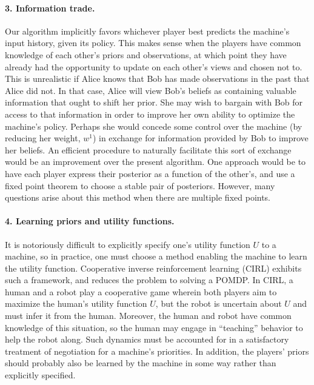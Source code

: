 \documentclass{article}  %
\begin{document}
\paragraph{3. Information trade.}  Our algorithm implicitly favors whichever player best predicts the machine's input history, given its policy.  This makes sense when the players have common knowledge of each other's priors and observations, at which point they have already had the opportunity to update on each other's views and chosen not to.  This is unrealistic if Alice knows that Bob has made observations in the past that Alice did not.  In that case, Alice will view Bob's beliefs as containing valuable information that ought to shift her prior.  She may wish to bargain with Bob for access to that information in order to improve her own ability to optimize the machine's policy.  Perhaps she would concede some control over the machine (by reducing her weight, $w^1$) in exchange for information provided by Bob to improve her beliefs.  An efficient procedure to naturally facilitate this sort of exchange would be an improvement over the present algorithm.  One approach would be to have each player express their posterior as a function of the other's, and use a fixed point theorem to choose a stable pair of posteriors.  However, many questions arise about this method when there are multiple fixed points.

\paragraph{4. Learning priors and utility functions.}  It is notoriously difficult to explicitly specify one's utility function $U$ to a machine, so in practice, one must choose a method enabling the machine to learn the utility function.  Cooperative inverse reinforcement learning (CIRL) \cite{HDAR16} exhibits such a framework, and reduces the problem to solving a POMDP.   In CIRL, a human and a robot play a cooperative game wherein both players aim to maximize the human's utility function $U$, but the robot is uncertain about $U$ and must infer it from the human.  Moreover, the human and robot have common knowledge of this situation, so the human may engage in ``teaching'' behavior to help the robot along.  Such dynamics must be accounted for in a satisfactory treatment of negotiation for a machine's priorities.  In addition, the players' priors should probably also be learned by the machine in some way rather than explicitly specified.
\end{document}
